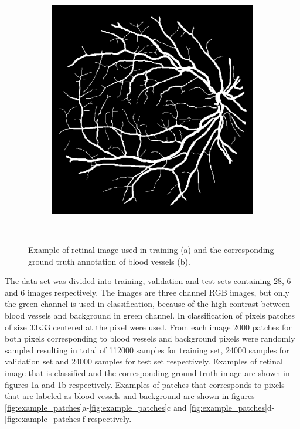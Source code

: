 \documentclass[aps,prb,10pt,twocolumn,groupedaddress]{revtex4-1}
\begin{document}
\begin{figure}[!t]
\begin{subfigure}[]{0.4\textwidth}
		\includegraphics[width=\textwidth]{images/02_manual1.eps}
		\caption{}
	\end{subfigure}\\
	\caption{Example of retinal image used in training (a) and the corresponding ground truth annotation of blood vessels (b).}
	\label{fig:example_images}
\end{figure}

The data set was divided into training, validation and test sets containing 28, 6 and 6 images respectively. The images are three channel RGB images, but only the green channel is used in classification, because of the high contrast between blood vessels and background in green channel\cite{green_contrast}. In classification of pixels patches of size 33x33 centered at the pixel were used. From each image 2000 patches for both pixels corresponding to blood vessels and background pixels were randomly sampled resulting in total of 112000 samples for training set, 24000 samples for validation set and 24000 samples for test set respectively. Examples of retinal image that is classified and the corresponding ground truth image are shown in figures \ref{fig:example_images}a and \ref{fig:example_images}b respectively. Examples of patches that corresponds to pixels that are labeled as blood vessels and background are shown in figures \ref{fig:example_patches}a-\ref{fig:example_patches}c and \ref{fig:example_patches}d-\ref{fig:example_patches}f respectively.
\end{document}
